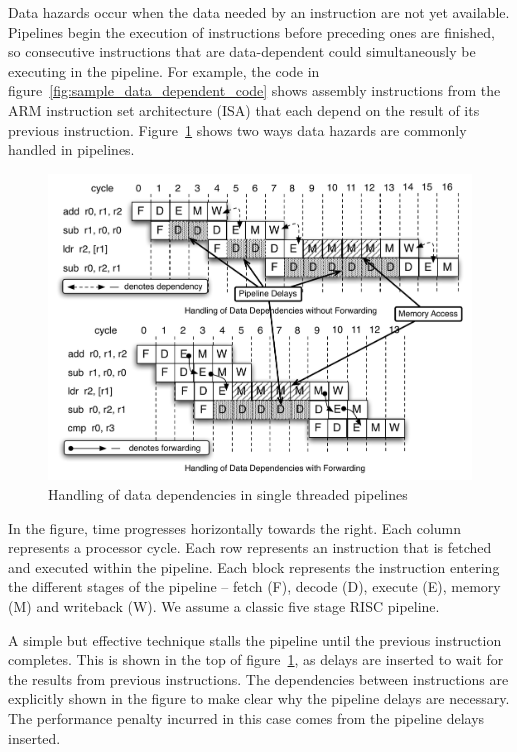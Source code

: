 Data hazards occur when the data needed by an instruction are not yet available.
Pipelines begin the execution of instructions before preceding ones are finished, so consecutive instructions that are data-dependent could simultaneously be executing in the pipeline.
For example, the code in figure~\ref{fig:sample_data_dependent_code} shows assembly instructions from the ARM instruction set architecture (ISA) that each depend on the result of its previous instruction.
Figure~\ref{fig:data_depend_execution_non_interleaved} shows two ways data hazards are commonly handled in pipelines. 

\begin{figure}
\vspace{-20pt} 
\begin{center}
\includegraphics[scale=.6]{figs/data_depend_execution_non_interleaved}
\end{center}
\vspace{-3mm}
\caption{Handling of data dependencies in single threaded pipelines}
\label{fig:data_depend_execution_non_interleaved}
\end{figure}

In the figure, time progresses horizontally towards the right.
Each column represents a processor cycle.
Each row represents an instruction that is fetched and executed within the pipeline.
Each block represents the instruction entering the different stages of the pipeline -- fetch (F), decode (D), execute (E), memory (M) and writeback (W).   
We assume a classic five stage RISC pipeline.

A simple but effective technique stalls the pipeline until the previous instruction completes.
This is shown in the top of figure~\ref{fig:data_depend_execution_non_interleaved}, as delays are inserted to wait for the results from previous instructions.
The dependencies between instructions are explicitly shown in the figure to make clear why the pipeline delays are necessary.
The performance penalty incurred in this case comes from the pipeline delays inserted.

